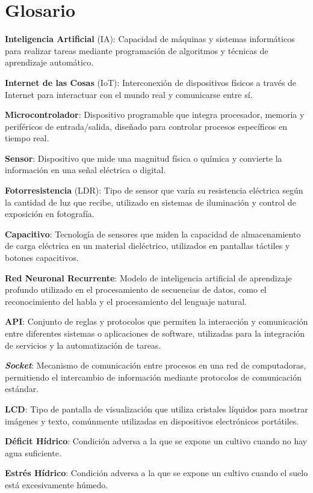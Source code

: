 \section{Glosario}
\noindent\textbf{Inteligencia Artificial} (IA): Capacidad de máquinas y sistemas informáticos para realizar tareas mediante programación de algoritmos y técnicas de aprendizaje automático.

\noindent\textbf{Internet de las Cosas} (IoT): Interconexión de dispositivos físicos a través de Internet para interactuar con el mundo real y comunicarse entre sí.

\noindent\textbf{Microcontrolador}: Dispositivo programable que integra procesador, memoria y periféricos de entrada/salida, diseñado para controlar procesos específicos en tiempo real.

\noindent\textbf{Sensor}: Dispositivo que mide una magnitud física o química y convierte la información en una señal eléctrica o digital.

\noindent\textbf{Fotorresistencia} (LDR): Tipo de sensor que varía su resistencia eléctrica según la cantidad de luz que recibe, utilizado en sistemas de iluminación y control de exposición en fotografía.

\noindent\textbf{Capacitivo}: Tecnología de sensores que miden la capacidad de almacenamiento de carga eléctrica en un material dieléctrico, utilizados en pantallas táctiles y botones capacitivos.

\noindent\textbf{Red Neuronal Recurrente}: Modelo de inteligencia artificial de aprendizaje profundo utilizado en el procesamiento de secuencias de datos, como el reconocimiento del habla y el procesamiento del lenguaje natural.

\noindent\textbf{API}: Conjunto de reglas y protocolos que permiten la interacción y comunicación entre diferentes sistemas o aplicaciones de software, utilizadas para la integración de servicios y la automatización de tareas.

\noindent\textbf{\textit{Socket}}: Mecanismo de comunicación entre procesos en una red de computadoras, permitiendo el intercambio de información mediante protocolos de comunicación estándar.

\noindent\textbf{LCD}: Tipo de pantalla de visualización que utiliza cristales líquidos para mostrar imágenes y texto, comúnmente utilizadas en dispositivos electrónicos portátiles.

\noindent\textbf{Déficit Hídrico}: Condición adversa a la que se expone un cultivo cuando no hay agua suficiente.

\noindent\textbf{Estrés Hídrico}: Condición adversa a la que se expone un cultivo cuando el suelo está excesivamente húmedo.